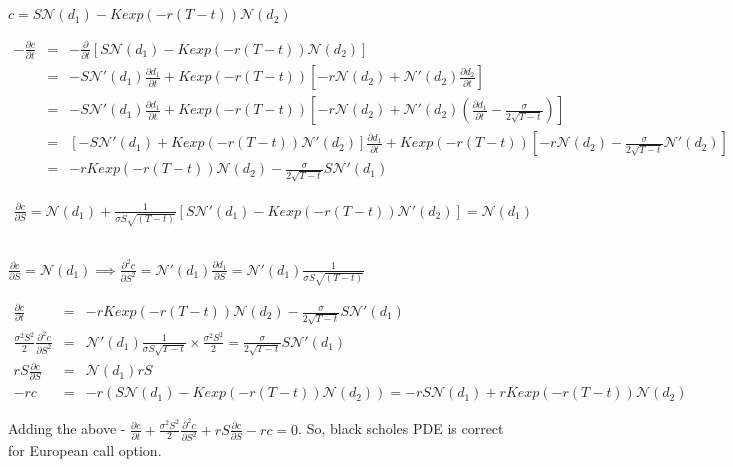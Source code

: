 \documentclass[11pt, fleqn]{article}
\begin{document}
\subsection{}
$c = S\mathcal{N}(d_1) - Kexp(-r(T-t))\mathcal{N}(d_2)$

\begin{eqnarray*}
-\frac{\partial c}{\partial t} &=& -\frac{\partial}{\partial t}[S\mathcal{N}(d_1) - Kexp(-r(T-t))\mathcal{N}(d_2)] \\
&=& -S\mathcal{N}'(d_1)\frac{\partial d_1}{\partial t} + Kexp(-r(T-t))[-r\mathcal{N}(d_2) + \mathcal{N}'(d_2)\frac{\partial d_2}{\partial t}]\\
&=& -S\mathcal{N}'(d_1)\frac{\partial d_1}{\partial t} + Kexp(-r(T-t))[-r\mathcal{N}(d_2) + \mathcal{N}'(d_2)(\frac{\partial d_1}{\partial t} - \frac{\sigma}{2\sqrt{T-t}})]\\
&=& [-S\mathcal{N}'(d_1) + Kexp(-r(T-t))\mathcal{N}'(d_2)]\frac{\partial d_1}{\partial t} + Kexp(-r(T-t))[-r\mathcal{N}(d_2) - \frac{\sigma}{2\sqrt{T-t}}\mathcal{N}'(d_2)]\\
&=& -rKexp(-r(T-t))\mathcal{N}(d_2) - \frac{\sigma}{2\sqrt{T-t}}S\mathcal{N}'(d_1)
\end{eqnarray*}

\begin{eqnarray*}
\frac{\partial c}{\partial S} = \mathcal{N}(d_1) + \frac{1}{\sigma S \sqrt{(T-t)}}[S\mathcal{N}'(d_1) - Kexp(-r(T-t))\mathcal{N}'(d_2)] = \mathcal{N}(d_1)
\end{eqnarray*}

\subsection{}
$
\frac{\partial c}{\partial S} = \mathcal{N}(d_1)
\implies \frac{\partial^2 c}{\partial S^2} = \mathcal{N}'(d_1)\frac{\partial d_1}{\partial S} = \mathcal{N}'(d_1)\frac{1}{\sigma S \sqrt{(T-t)}}
$

\begin{eqnarray*}
\frac{\partial c}{\partial t} &=& -rKexp(-r(T-t))\mathcal{N}(d_2) - \frac{\sigma}{2\sqrt{T-t}}S\mathcal{N}'(d_1) \\
\frac{\sigma^2S^2}{2}\frac{\partial^2 c}{\partial S^2} &=& \mathcal{N}'(d_1)\frac{1}{\sigma S \sqrt{T-t}}\times\frac{\sigma^2S^2}{2} = \frac{\sigma}{2\sqrt{T-t}}S\mathcal{N}'(d_1)\\
rS\frac{\partial c}{\partial S} &=& \mathcal{N}(d_1)rS\\
-rc &=& -r(S\mathcal{N}(d_1) - Kexp(-r(T-t))\mathcal{N}(d_2)) = -rS\mathcal{N}(d_1) + rKexp(-r(T-t))\mathcal{N}(d_2)
\end{eqnarray*}

Adding the above - $\frac{\partial c}{\partial t} + \frac{\sigma^2S^2}{2}\frac{\partial^2 c}{\partial S^2} + rS\frac{\partial c}{\partial S} - rc = 0$. So, black scholes PDE is correct for European call option.
\end{document}
